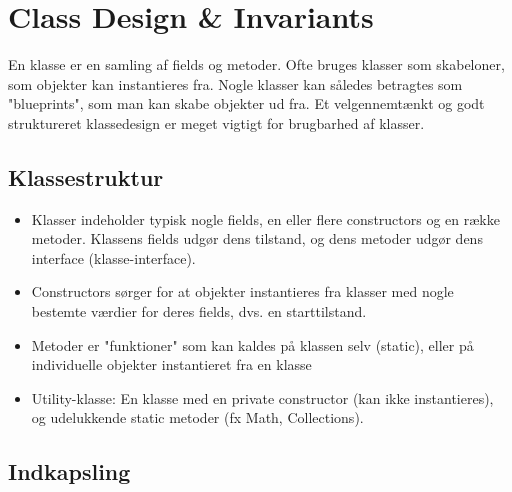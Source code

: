 \section{Class Design \& Invariants}

En klasse er en samling af fields og metoder. Ofte bruges klasser som skabeloner, som objekter kan instantieres fra. Nogle klasser kan således betragtes som "blueprints", som man kan skabe objekter ud fra. Et velgennemtænkt og godt struktureret klassedesign er meget vigtigt for brugbarhed af klasser.

\subsection{Klassestruktur}

\begin{itemize}
  \item Klasser indeholder typisk nogle fields, en eller flere constructors og en række metoder. Klassens fields udgør dens tilstand, og dens metoder udgør dens interface (klasse-interface).
  \item Constructors sørger for at objekter instantieres fra klasser med nogle bestemte værdier for deres fields, dvs. en starttilstand.
  \item Metoder er "funktioner" som kan kaldes på klassen selv (static), eller på individuelle objekter instantieret fra en klasse
  \item Utility-klasse: En klasse med en private constructor (kan ikke instantieres), og udelukkende static metoder (fx Math, Collections).
\end{itemize}

\subsection{Indkapsling}

